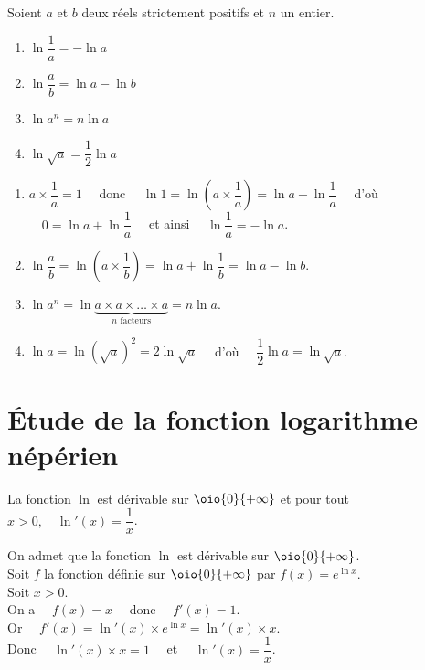 \documentclass[a4paper,11pt,cours]{nsi} %
\begin{document}
\begin{propriete}[s]
    Soient $a$ et $b$ deux réels strictement positifs et $n$ un entier.
    \begin{multicols}{4}
        \begin{enumerate}[label=\textbullet]
            \item $\ln \dfrac{1}{a}=-\ln a$
            \item $\ln \dfrac{a}{b}=\ln a-\ln b$
            \item $\ln a^n=n\ln a$
            \item $\ln \sqrt{a}=\dfrac{1}{2}\ln a$
        \end{enumerate}
    \end{multicols}
\end{propriete}

\begin{demonstration}
    \begin{enumerate}[label=\textbullet]
        \item $a\times \dfrac{1}{a}=1\quad$ donc $\quad \ln 1=\ln\left(a\times\dfrac{1}{a}\right)=\ln a +\ln \dfrac{1}{a}\quad$ d'où $\quad 0=\ln a+\ln \dfrac{1}{a}\quad$ et ainsi $\quad \ln \dfrac{1}{a}=-\ln a$.
        \item $\ln \dfrac{a}{b}=\ln\left(a\times \dfrac{1}{b}\right)=\ln a +\ln \dfrac{1}{b}=\ln a -\ln b$.
        \item $\ln a^n=\ln \underbrace{a\times a\times \ldots \times a}_{n\text{ facteurs}}=n\ln a$.
        \item $\ln a=\ln \left(\sqrt{a}\right)^2=2\ln \sqrt{a}\quad$ d'où $\quad \dfrac{1}{2}\ln a=\ln \sqrt{a}$.
    \end{enumerate}
\end{demonstration}


\section{Étude de la fonction logarithme népérien}
\begin{propriete}[]
    La fonction $\ln$ est dérivable sur $\oio{0}{+\infty}$ et pour tout $x>0,\quad \ln'(x)=\dfrac{1}{x}$.
\end{propriete}

\begin{demonstration}
    On admet que la fonction $\ln$ est dérivable sur $\oio{0}{+\infty}$.\\
    Soit $f$ la fonction définie sur $\oio{0}{+\infty}$ par $f(x)=e^{\ln x}$.\\
    Soit $x>0$.\\
    On a $ \quad f(x)=x\quad$ donc $\quad f'(x)=1$.\\
    Or $\quad f'(x)=\ln'(x)\times e^{\ln x}=\ln'(x)\times x$.\\
    Donc $\quad \ln'(x)\times x=1\quad$ et $\quad\ln'(x)=\dfrac{1}{x}$.
\end{demonstration}
\end{document}
